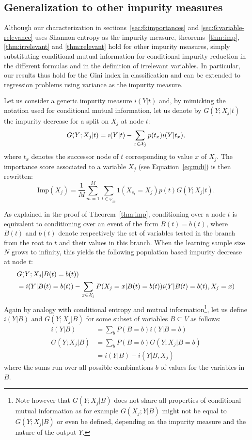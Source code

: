 \subsection{Generalization to other impurity measures}

Although our characterization in sections~\ref{sec:6:importances} and
\ref{sec:6:variable-relevance} uses Shannon entropy as the impurity measure,
theorems~\ref{thm:imp}, \ref{thm:irrelevant} and \ref{thm:relevant} hold for
other impurity measures, simply substituting conditional mutual information for
conditional impurity reduction in the different formulas and in the definition
of irrelevant variables.  In particular, our results thus hold for the Gini
index in classification and can be extended to regression problems using
variance as the impurity measure.

Let us consider a generic impurity measure $i(Y|t)$ and, by mimicking the
notation used for conditional mutual information, let us denote by $G(Y;X_j|t)$
the impurity decrease for a split on $X_j$ at node $t$:
\begin{equation}%
G(Y;X_j|t) = i(Y|t)-\sum_{x\in{\cal X}_j} p(t_x) i(Y|t_x),
\end{equation}
where $t_{x}$ denotes the successor node of $t$ corresponding to value
$x$ of $X_j$. The importance score associated to a variable $X_j$ (see
Equation~\ref{eq:mdi}) is then rewritten:
\begin{equation}\label{eq:mdigen}
\text{Imp}(X_j) = \frac{1}{M} \sum_{m=1}^M \sum_{t \in \varphi_m} 1(X_{s_t} = X_j) p(t) G(Y;X_j|t).
\end{equation}

As explained in the proof of Theorem~\ref{thm:imp}, conditioning
over a node $t$ is equivalent to conditioning over an event of the
form $B(t)=b(t)$, where $B(t)$ and $b(t)$ denote respectively the set
of variables tested in the branch from the root to $t$ and their
values in this branch. When the learning sample size $N$ grows to
infinity, this yields the following population based impurity decrease
at node $t$:
\begin{align}
&G(Y;X_j|B(t)=b(t)) \\
&=i(Y|B(t)=b(t))-\sum_{x\in{\cal X}_j} P(X_j=x|B(t)=b(t)) i(Y|B(t)=b(t),X_j=x) \nonumber \label{eqn:imppop}
\end{align}
Again by analogy with conditional entropy and mutual
information\footnote{Note however that $G(Y;X_j|B)$ does not share all
  properties of conditional mutual information as for example $G(X_j;
  Y|B)$ might not be equal to $G(Y; X_j|B)$ or even be defined,
  depending on the impurity measure and the nature of the output
  $Y$.}, let us define $i(Y|B)$ and $G(Y;X_j|B)$ for some subset of
variables $B\subseteq V$ as follows:
\begin{align}
i(Y|B)&=\sum_{b} P(B=b) i(Y|B=b)\\
G(Y;X_j|B)&= \sum_{b} P(B=b) G(Y;X_j|B=b)\\
&=i(Y|B)-i(Y|B,X_j) \nonumber
\end{align}
where the sums run over all possible combinations $b$ of values for
the variables in $B$.

